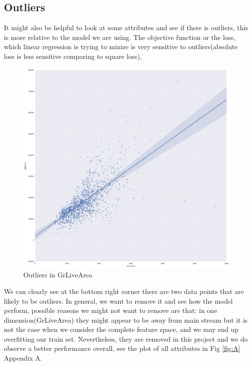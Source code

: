 \documentclass[12pt]{article}
\begin{document}
\subsection{Outliers}
It might also be helpful to look at some attributes and see if there is outliers, this is more relative to the model we are using. The objective function or the loss, which linear regression is trying to minize is very sensitive to outliers(absolute loss is less sensitive comparing to square loss),
\begin{figure}[h!]
	\centering
	\includegraphics[width=0.6\linewidth]{outlier.png}
	\caption{Outliers in GrLiveArea}
	\label{fig:1}
\end{figure}
We can clearly see at the bottom right corner there are two data points that are likely to be outliers. In general, we want to remove it and see how the model perform, possible reasons we might not want to remove are that: in one dimension(GrLiveArea) they might appear to be away from main stream but it is not the case when we consider the complete feature space, and we may end up overfitting our train set. Nevertheless, they are removed in this project and we do observe a better performance overall, see the plot of all attributes in Fig \ref{fig:A} Appendix A. 
\end{document}
